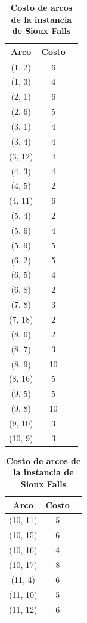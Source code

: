 \documentclass{article}
\begin{document}
  \begin{table}[h!]
    \centering
    \caption*{{\bf Costo de arcos de la instancia de Sioux Falls}}
    \begin{tabular}{ccc}
      \toprule
        Arco & Costo \\
      \midrule
        (1, 2) & 6 \\
        (1, 3) & 4 \\
        (2, 1) & 6 \\
        (2, 6) & 5 \\
        (3, 1) & 4 \\
        (3, 4) & 4 \\
        (3, 12) & 4 \\
        (4, 3) & 4 \\
        (4, 5) & 2 \\
        (4, 11) & 6 \\
        (5, 4) & 2 \\
        (5, 6) & 4 \\
        (5, 9) & 5 \\
        (6, 2) & 5 \\
        (6, 5) & 4 \\
        (6, 8) & 2 \\
        (7, 8) & 3 \\
        (7, 18) & 2 \\
        (8, 6) & 2 \\
        (8, 7) & 3 \\
        (8, 9) & 10 \\
        (8, 16) & 5 \\
        (9, 5) & 5 \\
        (9, 8) & 10 \\
        (9, 10) & 3 \\
        (10, 9) & 3 \\
      \bottomrule
    \end{tabular}
    \begin{tabular}{ccc}
      \toprule
        Arco & Costo \\
      \midrule
        (10, 11) & 5 \\
        (10, 15) & 6 \\
        (10, 16) & 4 \\
        (10, 17) & 8 \\
        (11, 4) & 6 \\
        (11, 10) & 5 \\
        (11, 12) & 6 \\

\end{tabular}
\end{table}
\end{document}
